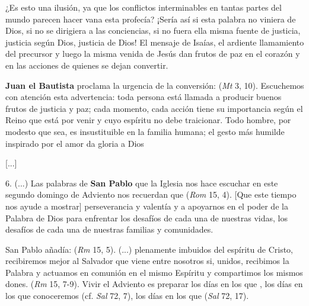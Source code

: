 \begin{body}
\begin{body}
		¿Es esto una ilusión, ya que los conflictos interminables en tantas partes del mundo parecen hacer vana esta profecía? ¡Sería así si esta palabra no viniera de Dios, si no se dirigiera a las conciencias, si no fuera ella misma fuente de justicia, justicia según Dios, justicia de Dios! El mensaje de Isaías, el ardiente llamamiento del precursor y luego la misma venida de Jesús dan frutos de paz en el corazón y en las acciones de quienes se dejan convertir.
		
		\textbf{Juan el Bautista} proclama la urgencia de la conversión:  (\emph{Mt} 3, 10). Escuchemos con atención esta advertencia: toda persona está llamada a producir buenos frutos de justicia y paz; cada momento, cada acción tiene su importancia según el Reino que está por venir y cuyo espíritu no debe traicionar. Todo hombre, por modesto que sea, es insustituible en la familia humana; el gesto más humilde inspirado por el amor da gloria a Dios
		
		{[}...{]}
		
		6. (...) Las palabras de \textbf{San Pablo} que la Iglesia nos hace escuchar en este segundo domingo de Adviento nos recuerdan que  (\emph{Rom} 15, 4). {[}Que este tiempo nos ayude a mostrar{]} perseverancia y valentía y a apoyarnos en el poder de la Palabra de Dios para enfrentar los desafíos de cada una de nuestras vidas, los desafíos de cada una de nuestras familias y comunidades.
		
		San Pablo añadía:  (\emph{Rm} 15, 5). (...) plenamente imbuidos del espíritu de Cristo, recibiremos mejor al Salvador que viene entre nosotros si, unidos, recibimos la Palabra y actuamos en comunión en el mismo Espíritu y compartimos los mismos dones.  (\emph{Rm} 15, 7-9). Vivir el Adviento es preparar los días en los que , los días en los que conoceremos  (cf. \emph{Sal} 72, 7), los días en los que  (\emph{Sal} 72, 17).
		

\end{body}
\end{body}
